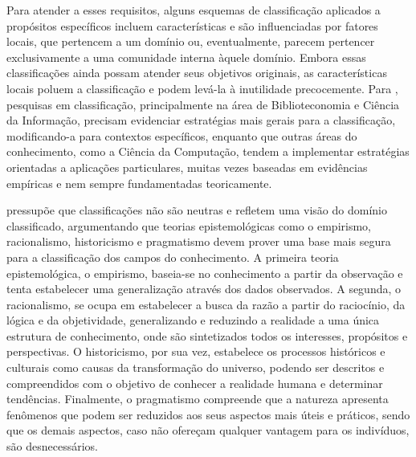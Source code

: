 Para atender a esses requisitos, alguns esquemas de classificação aplicados a propósitos específicos incluem características e são influenciadas por fatores locais, que pertencem a um domínio ou, eventualmente, parecem pertencer exclusivamente a uma comunidade interna àquele domínio. Embora essas classificações ainda possam atender seus objetivos originais, as características locais poluem a classificação e podem levá-la à inutilidade precocemente. Para , pesquisas em classificação, principalmente na área de Biblioteconomia e Ciência da Informação, precisam evidenciar estratégias mais gerais para a classificação, modificando-a para contextos específicos, enquanto que outras áreas do conhecimento, como a Ciência da Computação, tendem a implementar estratégias orientadas a aplicações particulares, muitas vezes baseadas em evidências empíricas e nem sempre fundamentadas teoricamente.

 pressupõe que classificações não são neutras e refletem uma visão do domínio classificado, argumentando que teorias epistemológicas como o empirismo, racionalismo, historicismo e pragmatismo devem prover uma base mais segura para a classificação dos campos do conhecimento. A primeira teoria epistemológica, o empirismo, baseia-se no conhecimento a partir da observação e tenta estabelecer uma generalização através dos dados observados. A segunda, o racionalismo, se ocupa em estabelecer a busca da razão a partir do raciocínio, da lógica e da objetividade, generalizando e reduzindo a realidade a uma única estrutura de conhecimento, onde são sintetizados todos os interesses, propósitos e perspectivas. O historicismo, por sua vez, estabelece os processos históricos e culturais como causas da transformação do universo, podendo ser descritos e compreendidos com o objetivo de conhecer a realidade humana e determinar tendências. Finalmente, o pragmatismo compreende que a natureza apresenta fenômenos que podem ser reduzidos aos seus aspectos mais úteis e práticos, sendo que os demais aspectos, caso não ofereçam qualquer vantagem para os indivíduos, são desnecessários.

